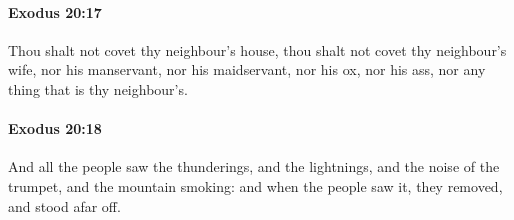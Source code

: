 		\paragraph{Exodus 20:17} %
			\label{EXODUS-20-17}

			Thou shalt not covet thy neighbour's house, thou shalt not covet thy neighbour's wife, nor his manservant, nor his maidservant, nor his ox, nor his ass, nor any thing that is thy neighbour's.


		\paragraph{Exodus 20:18} %
			\label{EXODUS-20-18}

			And all the people saw the thunderings, and the lightnings, and the noise of the trumpet, and the mountain smoking: and when the people saw it, they removed, and stood afar off.


